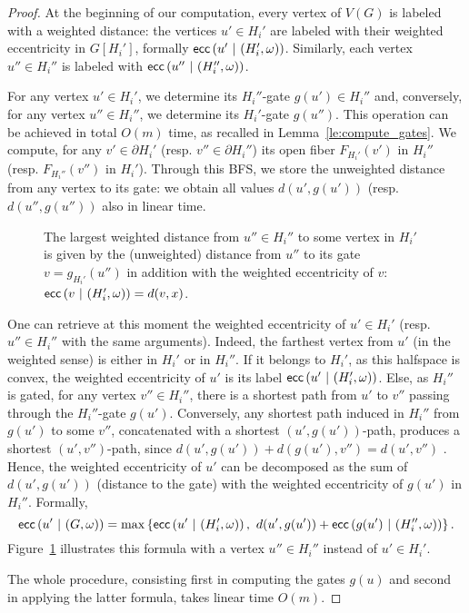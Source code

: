 \documentclass[11pt,letterpaper]{article}
\newcommand{\ecc}{\mbox{\textsf{ecc}}}
\newcommand{\wecc}[2]{\mbox{\textsf{ecc}}\left(#1 ~\vert ~ #2\right)}
\begin{document}
\begin{proof}
At the beginning of our computation, every vertex of $V(G)$ is labeled with a  weighted distance: the vertices $u' \in H_i'$ are labeled with their weighted eccentricity in $G[H_i']$, formally $\wecc{u'}{(H_i',\omega)}$. Similarly, each vertex $u'' \in H_i''$ is labeled with $\wecc{u''}{(H_i'',\omega)}$. 

For any vertex $u' \in H_i'$, we determine its $H_i''$-gate $g(u') \in H_i''$ and, conversely, for any vertex $u'' \in H_i''$, we determine its $H_i'$-gate $g(u'')$. This operation can be achieved in total $O(m)$ time, as recalled in Lemma~\ref{le:compute_gates}. We compute, for any $v' \in \partial H_i'$ (resp. $v'' \in \partial H_i''$) its open fiber $F_{H_i'}(v')$ in $H_i''$ (resp. $F_{H_i''}(v'')$ in $H_i'$). Through this BFS, we store the unweighted distance from any vertex to its gate: we obtain all values $d(u',g(u'))$ (resp. $d(u'',g(u''))$ also in linear time.

\begin{figure}[h]
\centering
\scalebox{0.8}{}
\caption{The largest weighted distance from $u'' \in H_i''$ to some vertex in $H_i'$ is given by the (unweighted) distance from $u''$ to its gate $v = g_{H_i'}(u'')$ in addition with the weighted eccentricity of $v$: $\wecc{v}{(H_i',\omega)} = d(v,x)$.}
\label{fig:fibers}
\end{figure}

One can retrieve at this moment the weighted eccentricity of $u' \in H_i'$ (resp. $u'' \in H_i''$ with the same arguments). Indeed, the farthest vertex from $u'$ (in the weighted sense) is either in $H_i'$ or in $H_i''$. If it belongs to $H_i'$, as this halfspace is convex, the weighted eccentricity of $u'$ is its label $\wecc{u'}{(H_i',\omega)}$. Else, as $H_i''$ is gated, for any vertex $v'' \in H_i''$, there is a shortest path from $u'$ to $v''$ passing through the $H_i''$-gate $g(u')$. Conversely, any shortest path induced in $H_i''$ from $g(u')$ to some $v''$, concatenated with a shortest $(u',g(u'))$-path, produces a shortest $(u',v'')$-path, since $d(u',g(u')) + d(g(u'),v'') = d(u',v'')$
. Hence, the weighted eccentricity of $u'$ can be decomposed as the sum of $d(u',g(u'))$ (distance to the gate) with the weighted eccentricity of $g(u')$ in $H_i''$. 
Formally, $$\wecc{u'}{(G,\omega)} = \max \left\{\wecc{u'}{(H_i',\omega)}, ~d(u',g(u')) + \wecc{g(u')}{(H_i'',\omega)}\right\}.$$ 
Figure~\ref{fig:fibers} illustrates this formula with a vertex $u'' \in H_i''$ instead of $u' \in H_i'$.

The whole procedure, consisting first in computing the gates $g(u)$ and second in applying the latter formula, takes linear time $O(m)$.
\end{proof}
\end{document}
